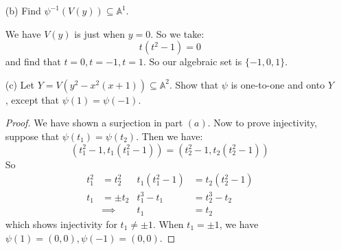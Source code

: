 \documentclass{article}
\begin{document}
\begin{itemize}
        \item [(b)] Find $\psi^{-1}(V(y)) \subseteq \mathbb{A}^{1}$.
            \begin{answer}
                We have $V(y)$ is just when $y = 0$. So we take:
                    \begin{equation*}
                        t(t^{2} - 1) = 0
                    \end{equation*}
                and find that $t = 0, t = -1, t = 1$. So our algebraic set is $\{-1, 0, 1\}$.
            \end{answer}

        \item [(c)] Let $Y = V(y^{2} - x^{2}(x + 1)) \subseteq \mathbb{A}^{2}$. Show that $\psi$ is one-to-one and onto $Y$, except that $\psi(1) = \psi(-1)$.
            \begin{proof}
                We have shown a surjection in part $(a)$. Now to prove injectivity, suppose that $\psi(t_{1}) = \psi(t_{2})$. Then we have:
                    \begin{equation*}
                        (t_{1}^{2} - 1, t_{1}(t_{1}^{2} - 1)) = (t_{2}^{2} - 1, t_{2}(t_{2}^{2} - 1))
                    \end{equation*}
                So 
                    \begin{align*}
                        t_{1}^{2} &=         t_{2}^{2} & t_{1}(t_{1}^{2} - 1) &= t_{2}(t_{2}^{2} - 1) \\
                        t_{1}     &=         \pm t_{2} & t_{1}^{3} - t_{1}    &= t_{2}^{3} - t_{2}    \\
                                  &\implies            & t_{1}                &= t_{2}                  
                    \end{align*}
                which shows injectivity for $t_{1} \neq \pm 1$. When $t_{1} = \pm 1$, we have $\psi(1) = (0, 0), \psi(-1) = (0, 0)$.
            \end{proof}


\end{itemize}
\end{document}
